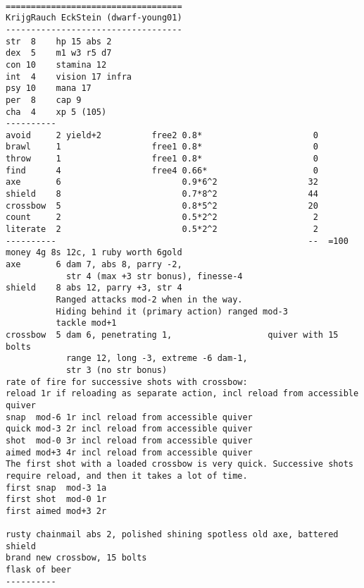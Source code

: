 \

\pagebreak[1]
\tiny \begin{samepage} \begin{verbatim}
===================================
KrijgRauch EckStein (dwarf-young01)
-----------------------------------
str  8    hp 15 abs 2
dex  5    m1 w3 r5 d7
con 10    stamina 12
int  4    vision 17 infra
psy 10    mana 17
per  8	  cap 9
cha  4    xp 5 (105)
----------
avoid     2 yield+2          free2 0.8*                      0
brawl     1                  free1 0.8*                      0
throw     1                  free1 0.8*                      0
find      4                  free4 0.66*                     0
axe       6                        0.9*6^2                  32
shield    8                        0.7*8^2                  44
crossbow  5                        0.8*5^2                  20
count     2                        0.5*2^2                   2
literate  2                        0.5*2^2                   2
----------                                                  --  =100
money 4g 8s 12c, 1 ruby worth 6gold
axe       6 dam 7, abs 8, parry -2,
            str 4 (max +3 str bonus), finesse-4
shield    8 abs 12, parry +3, str 4
          Ranged attacks mod-2 when in the way.
          Hiding behind it (primary action) ranged mod-3
          tackle mod+1
crossbow  5 dam 6, penetrating 1,                   quiver with 15 bolts
            range 12, long -3, extreme -6 dam-1,
            str 3 (no str bonus)
rate of fire for successive shots with crossbow:
reload 1r if reloading as separate action, incl reload from accessible quiver
snap  mod-6 1r incl reload from accessible quiver
quick mod-3 2r incl reload from accessible quiver
shot  mod-0 3r incl reload from accessible quiver
aimed mod+3 4r incl reload from accessible quiver
The first shot with a loaded crossbow is very quick. Successive shots require reload, and then it takes a lot of time.
first snap  mod-3 1a
first shot  mod-0 1r
first aimed mod+3 2r

rusty chainmail abs 2, polished shining spotless old axe, battered shield
brand new crossbow, 15 bolts
flask of beer
----------
\end{verbatim} \end{samepage} \normalsize


\

